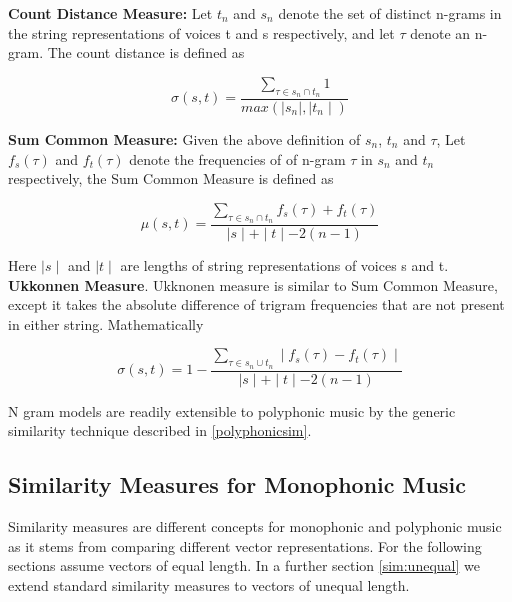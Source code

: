 \noindent \textbf{Count Distance Measure:} Let $t_n$ and $s_n$ denote the set of distinct n-grams in the string representations of voices t and s respectively, and let $\tau$ denote an n-gram. The count distance is defined as 

\begin{equation}
\sigma(s, t) = \frac{\sum_{\tau \in s_n \cap t_n} 1}{max (\mid s_n \mid, \mid t_n \mid)}
\end{equation}

\noindent \textbf{Sum Common Measure:} Given the above definition of $s_n$, $t_n$ and $\tau$, Let $f_s(\tau)$ and $f_t(\tau)$ denote the frequencies of of n-gram $\tau$ in $s_n$  and $t_n$ respectively, the Sum Common Measure is defined as

\begin{equation}
\mu(s, t) = \frac{\sum_{\tau \in s_n \cap t_n} f_s(\tau) + f_t(\tau)}{\mid s \mid + \mid t \mid - 2(n-1)}
\end{equation}

Here $\mid s \mid$ and $\mid t \mid$ are lengths of string representations of voices s and t. \\

\noindent \textbf{Ukkonnen Measure}. Ukknonen measure is similar to Sum Common Measure, except it takes the absolute difference of trigram frequencies that are not present in either string. Mathematically 

\begin{equation}
\sigma(s, t) = 1 - \frac{\sum_{\tau \in s_n \cup t_n} \mid f_s(\tau) - f_t(\tau) \mid}{\mid s \mid + \mid t \mid - 2(n-1)}
\end{equation}

\noindent N gram models are readily extensible to polyphonic music by the generic similarity technique described in \ref{polyphonicsim}.

\subsection{Similarity Measures for Monophonic Music} \label{monophonicSim}

\noindent Similarity measures are different concepts for monophonic and polyphonic music as it stems from comparing different vector representations. For the following sections assume vectors of equal length. In a further section \ref{sim:unequal} we extend standard similarity measures to vectors of unequal length. \\

